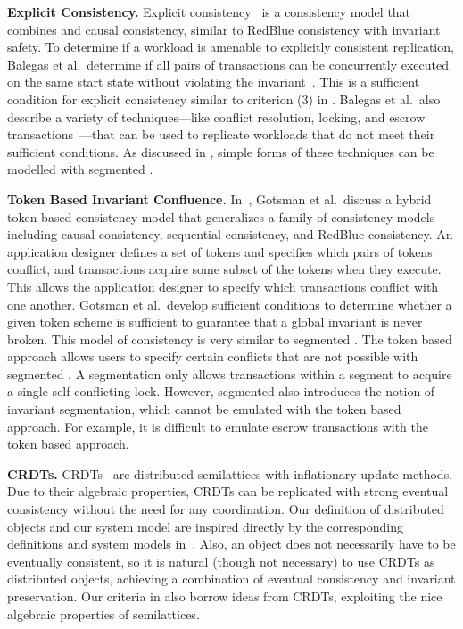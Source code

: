 \textbf{Explicit Consistency.}
Explicit consistency~\cite{balegas2015towards} is a consistency model that
combines \invariantconfluence{} and causal consistency, similar to RedBlue
consistency with invariant safety. To determine if a workload is amenable to
explicitly consistent replication, Balegas et al.\ determine if all pairs of
transactions can be concurrently executed on the same start state without
violating the invariant~\cite{balegas2015towards}.  This is a sufficient
condition for explicit consistency similar to criterion (3) in
. Balegas et al.\ also describe a variety of
techniques---like conflict resolution, locking, and escrow
transactions~\cite{o1986escrow}---that can be used to replicate workloads that
do not meet their sufficient conditions. As discussed in ,
simple forms of these techniques can be modelled with segmented
\invariantconfluence{}.

\textbf{Token Based Invariant Confluence.}
In~\cite{gotsman2016cause}, Gotsman et al.\ discuss a hybrid token based
consistency model that generalizes a family of consistency models including
causal consistency, sequential consistency, and RedBlue consistency. An
application designer defines a set of tokens and specifies which pairs of
tokens conflict, and transactions acquire some subset of the tokens when they
execute. This allows the application designer to specify which transactions
conflict with one another.  Gotsman et al.\ develop sufficient conditions to
determine whether a given token scheme is sufficient to guarantee that a global
invariant is never broken. This model of consistency is very similar to
segmented \invariantconfluence{}. The token based approach allows users to
specify certain conflicts that are not possible with segmented
\invariantconfluence{}. A segmentation only allows transactions within a
segment to acquire a single self-conflicting lock. However, segmented
\invariantconfluence{} also introduces the notion of invariant segmentation,
which cannot be emulated with the token based approach. For example, it is
difficult to emulate escrow transactions with the token based approach.

\textbf{CRDTs.}
CRDTs~\cite{shapiro2011conflict, shapiro2011comprehensive} are distributed
semilattices with inflationary update methods. Due to their algebraic
properties, CRDTs can be replicated with strong eventual consistency without
the need for any coordination. Our definition of distributed objects and our
\invariantconfluence{} system model are inspired directly by the corresponding
definitions and system models in~\cite{shapiro2011conflict}. Also, an
\invariantconfluent{} object does not necessarily have to be eventually
consistent, so it is natural (though not necessary) to use CRDTs as
\invariantconfluent{} distributed objects, achieving a combination of eventual
consistency and invariant preservation. Our criteria in
 also borrow ideas from CRDTs, exploiting the nice
algebraic properties of semilattices.


